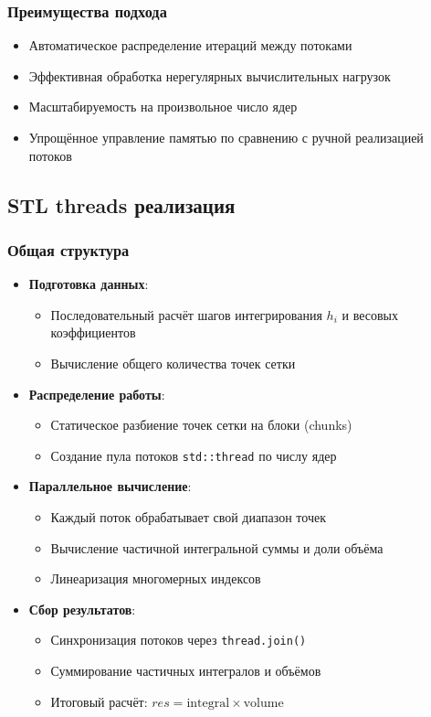 \documentclass[12pt]{article}
\begin{document}
\subsubsection*{Преимущества подхода}
\begin{itemize}
  \item Автоматическое распределение итераций между потоками
  \item Эффективная обработка нерегулярных вычислительных нагрузок
  \item Масштабируемость на произвольное число ядер
  \item Упрощённое управление памятью по сравнению с ручной реализацией потоков
\end{itemize}

\subsection{STL threads реализация}
\subsubsection*{Общая структура}
\begin{itemize}
  \item \textbf{Подготовка данных}:
  \begin{itemize}
    \item Последовательный расчёт шагов интегрирования $h_i$ и весовых коэффициентов
    \item Вычисление общего количества точек сетки
  \end{itemize}
  
  \item \textbf{Распределение работы}:
  \begin{itemize}
    \item Статическое разбиение точек сетки на блоки (chunks)
    \item Создание пула потоков \texttt{std::thread} по числу ядер
  \end{itemize}
  
  \item \textbf{Параллельное вычисление}:
  \begin{itemize}
    \item Каждый поток обрабатывает свой диапазон точек
    \item Вычисление частичной интегральной суммы и доли объёма
    \item Линеаризация многомерных индексов
  \end{itemize}
  
  \item \textbf{Сбор результатов}:
  \begin{itemize}
    \item Синхронизация потоков через \texttt{thread.join()}
    \item Суммирование частичных интегралов и объёмов
    \item Итоговый расчёт: $res = \text{integral} \times \text{volume}$
  \end{itemize}
\end{itemize}
\end{document}

